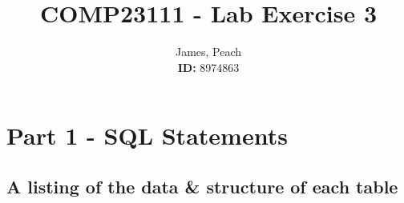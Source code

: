\documentclass[11pt,a4paper]{article}
\begin{document}
\title{\textbf{COMP23111} - Lab Exercise 3}

\author{James, Peach \\ \textbf{ID:} 8974863} 


\maketitle
\thispagestyle{empty} %
\newpage %

\section{Part 1 - SQL Statements}

\subsection{A listing of the data \& structure of each table}
\end{document}
